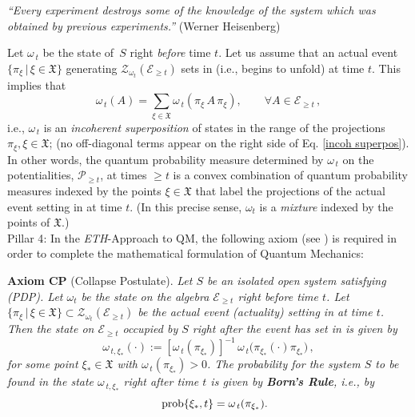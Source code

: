 \documentclass[12pt]{article}
\begin{document}
\hspace{0.5cm}\textit{``Every experiment destroys some of the knowledge of the system which was obtained by previous experiments.''} (Werner Heisenberg)

Let $\omega_{\,t}$ be the state of~$S$ right \textit{before} time $t$. Let us assume that an actual event
 $\big\{ \pi_{\xi} \,|\, \xi \in \mathfrak{X} \big\}$ generating $\mathcal{Z}_{\omega_t}(\mathcal{E}_{\geq t})$ sets in (i.e., begins to unfold) at time $t$. This implies that
 \begin{equation}\label{incoh superpos}
 \omega_{\,t}(A)= \sum_{\xi \in \mathfrak{X}} \omega_{\,t}(\pi_{\xi} \,A\, \pi_{\xi}), \qquad \forall A \in \mathcal{E}_{\geq t}\,,
 \end{equation}
 i.e., $\omega_{\,t}$ is an \textit{incoherent superposition} of states in the range of the projections
 $\pi_{\xi}, \xi \in \mathfrak{X}$; (no off-diagonal terms appear on the right side of Eq. \eqref{incoh superpos}). In other words, the quantum probability measure determined by $\omega_{\,t}$ on the potentialities, $\mathcal{P}_{\geq t}$, at times $\geq t$ is a convex combination of quantum probability measures indexed by the points $\xi \in \mathfrak{X}$ that label the projections of the actual event setting in at time $t$. (In this precise sense, $\omega_t$ is a \textit{mixture} indexed by the points of $\mathfrak{X}$.)\\

{Pillar 4}:  In the \textit{ETH}-Approach to QM, the following axiom (see \cite{Fr1}) is required in order to complete the mathematical formulation of Quantum Mechanics:

{\bf{Axiom CP}} (Collapse Postulate).\label{collapseaxiom} \textit{Let $S$ be an isolated open system satisfying (\textit{PDP}). Let
$\omega_t$ be the state on the algebra $\mathcal{E}_{\geq t}$ right \textit{before} time $t$. Let
$\big\{ \pi_{\xi} \,|\, \xi \in \mathfrak{X} \big\} \subset \mathcal{Z}_{\omega_t}(\mathcal{E}_{\geq t})$ be the actual event (actuality) setting in at time $t$. Then the state on $\mathcal{E}_{\geq t}$ occupied by $S$ right \textit{after} the event has set in is given by
$$
\omega_{\,t, \xi_{*}}(\cdot):=[\omega_{\,t}(\pi_{\xi_{*}})]^{-1}\,\omega_{\,t}\big(\pi_{\xi_{*}} (\cdot) \pi_{\xi_{*}}\big) \,,
$$
for some point $\xi_{*} \in \mathfrak{X}$ with $\omega_{\,t}(\pi_{\xi_{*}})>0$. The probability for the system $S$ to be found in the state $\omega_{\,t,\xi_{*}}$ right \textit{after} time $t$ is given by {\bf{Born's Rule}}, i.e., by}
\begin{equation}\label{Born Rule}
\hspace{4.9cm}\text{\rm{prob}}\{\xi_{*}, t\} = \omega_{\,t}(\pi_{\xi_{*}}). \hspace{4.5cm} \square
\vspace{0.2cm}
\end{equation}
\end{document}
